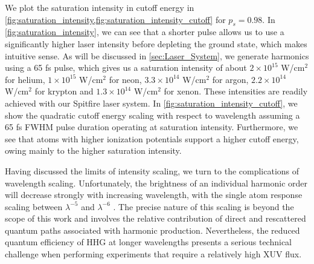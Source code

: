 We plot the saturation intensity in cutoff energy in \cref{fig:saturation_intensity,fig:saturation_intensity_cutoff} for $p_s = 0.98$. In \cref{fig:saturation_intensity}, we can see that a shorter pulse allows us to use a significantly higher laser intensity before depleting the ground state, which makes intuitive sense. As will be discussed in \cref{sec:Laser_System}, we generate harmonics using a 65 fs pulse, which gives us a saturation intensity of about $2\times10^{15}$ W/cm$^2$ for helium, $1\times10^{15}$ W/cm$^2$ for neon, $3.3\times10^{14}$ W/cm$^2$ for argon, $2.2\times10^{14}$ W/cm$^2$ for krypton and $1.3\times10^{14}$ W/cm$^2$ for xenon. These intensities are readily achieved with our Spitfire laser system. In \cref{fig:saturation_intensity_cutoff}, we show the quadratic cutoff energy scaling with respect to wavelength assuming a 65 fs FWHM pulse duration operating at saturation intensity. Furthermore, we see that atoms with higher ionization potentials support a higher cutoff energy, owing mainly to the higher saturation intensity.


Having discussed the limits of intensity scaling, we turn to the complications of wavelength scaling. Unfortunately, the brightness of an individual harmonic order will decrease strongly with increasing wavelength, with the single atom response scaling between $\lambda^{-5}$ and $\lambda^{-6}$ \cite{tateScalingWavePacketDynamics2007,shinerWavelengthScalingHigh2009,colosimoScalingStrongfieldInteractions2008}. The precise nature of this scaling is beyond the scope of this work and involves the relative contribution of direct and rescattered quantum paths associated with harmonic production. Nevertheless, the reduced quantum efficiency of HHG at longer wavelengths presents a serious technical challenge when performing experiments that require a relatively high XUV flux.

